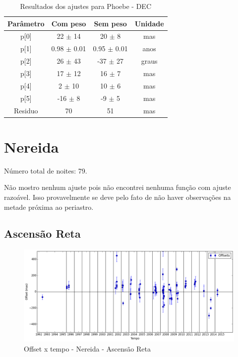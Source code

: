 \documentclass[11pt,a4paper]{report}
\begin{document}
\begin{table}[h!]
\caption{\label{Tab: Phoebe-DEC} Resultados dos ajustes para Phoebe - DEC}
\begin{centering}
\begin{tabular}{cccc}
\hline
\hline
Parâmetro & Com peso & Sem peso & Unidade\tabularnewline
\hline
p[0] & 22 $\pm$ 14 & 20 $\pm$ 8 & mas\\
p[1] & 0.98 $\pm$ 0.01 & 0.95 $\pm$ 0.01 & anos\\
p[2] & 26 $\pm$ 43 & -37 $\pm$ 27 & graus\\
p[3] & 17 $\pm$ 12 & 16 $\pm$ 7 & mas\\
p[4] & 2 $\pm$ 10 & 10 $\pm$ 6 & mas\\
p[5] & -16 $\pm$ 8 & -9 $\pm$ 5 & mas\\
Residuo & 70 & 51 & mas\\
\hline 
\end{tabular} 
\par\end{centering}
\end{table}

\chapter*{Nereida}

\indent \indent Número total de noites: 79.

Não mostro nenhum ajuste pois não encontrei nenhuma função com ajuste razoável. Isso provavelmente se deve pelo fato de não haver observações na metade próxima ao periastro.

\section*{Ascensão Reta}

\begin{figure}[h]
\caption{Offset x tempo - Nereida - Ascensão Reta}
\includegraphics[scale=0.45]{Nereida/RA.png} 
\end{figure}
\end{document}
